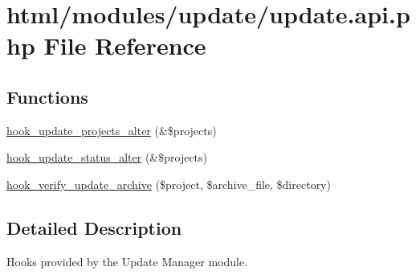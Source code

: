 \hypertarget{update_8api_8php}{
\section{html/modules/update/update.api.php File Reference}
\label{update_8api_8php}
}
\subsection*{Functions}
\begin{DoxyCompactItemize}
\item 
\hyperlink{group__hooks_gaed261bce503f9437df042668cc070bf7}{hook\_\-update\_\-projects\_\-alter} (\&\$projects)
\item 
\hyperlink{group__hooks_ga62b22dcd7e2e14b061cedd46a7862352}{hook\_\-update\_\-status\_\-alter} (\&\$projects)
\item 
\hyperlink{group__update__manager__file_ga68a5dd6bec824909f46d9458991eaf42}{hook\_\-verify\_\-update\_\-archive} (\$project, \$archive\_\-file, \$directory)
\end{DoxyCompactItemize}


\subsection{Detailed Description}
Hooks provided by the Update Manager module. 